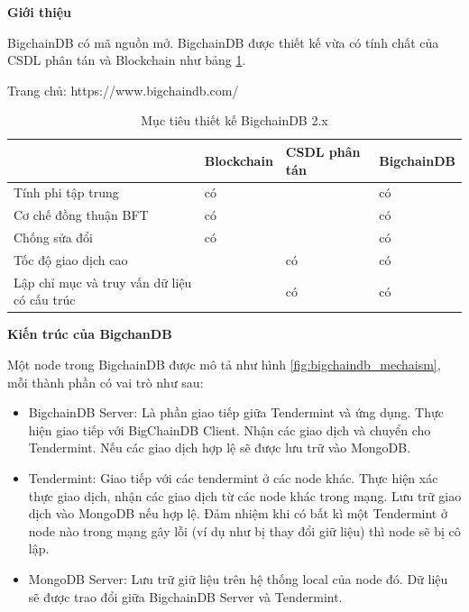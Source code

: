 \textbf{Giới thiệu}

BigchainDB có mã nguồn mở.
BigchainDB được thiết kế vừa có tính chất của CSDL phân tán và Blockchain như bảng \ref{table:bigchaindb}.

Trang chủ: https://www.bigchaindb.com/

\begin{table}
\caption{Mục tiêu thiết kế BigchainDB 2.x}
	\label{table:bigchaindb}
	\begin{tabularx} {\textwidth} {|X|p{2.8cm}|p{3cm}|p{2.2cm}|}
\hline
	 & Blockchain & CSDL phân tán & BigchainDB \\ \hline
	Tính phi tập trung & có &   & có \\ \hline
	Cơ chế đồng thuận BFT   & có  &   & có \\ \hline
	Chống sửa đổi  & có  &   & có \\ \hline
	Tốc độ giao dịch cao &  & có  & có \\ \hline
	Lập chỉ mục và truy vấn dữ liệu có cấu trúc   &   & có & có \\ \hline
\end{tabularx}
\end{table}

\textbf{Kiến trúc của BigchanDB}

Một node trong BigchainDB được mô tả như hình \ref{fig:bigchaindb_mechaism}, mỗi thành phần có vai trò như sau:

\begin{itemize}
	\item BigchainDB Server: Là phần giao tiếp giữa Tendermint và ứng dụng.
Thực hiện giao tiếp với BigChainDB Client.
Nhận các giao dịch và chuyển cho Tendermint.
Nếu các giao dịch hợp lệ sẽ được lưu trữ vào MongoDB.
	\item Tendermint: Giao tiếp với các tendermint ở các node khác.
Thực hiện xác thực giao dịch, nhận các giao dịch từ các node khác trong mạng.
Lưu trữ giao dịch vào MongoDB nếu hợp lệ.
Đảm nhiệm khi có bất kì một Tendermint ở node nào trong mạng gây lỗi (ví dụ như bị thay đổi giữ liệu) thì node sẽ bị cô lập.
	\item MongoDB Server: Lưu trữ giữ liệu trên hệ thống local của node đó. Dữ liệu sẽ được trao đổi giữa BigchainDB Server và Tendermint.
\end{itemize}

